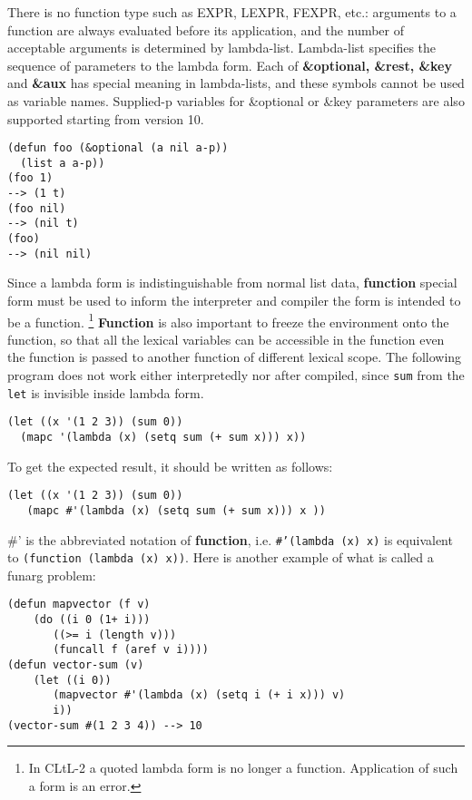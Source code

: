 There is no function type such as EXPR, LEXPR, FEXPR, etc.:
arguments to a function are always evaluated before its application,
and the number of acceptable arguments is determined by lambda-list.
Lambda-list specifies the sequence of parameters to the lambda form.
Each of {\bf \&optional, \&rest, \&key } and {\bf \&aux} has special
meaning in lambda-lists, and these symbols cannot be used as variable
names.
Supplied-p variables for \&optional or \&key parameters are also supported starting
from version 10.

\begin{verbatim}
(defun foo (&optional (a nil a-p))
  (list a a-p))
(foo 1)
--> (1 t)
(foo nil)
--> (nil t)
(foo)
--> (nil nil)
\end{verbatim}

Since a lambda form is indistinguishable from normal list data,
{\bf function} special form must be used to inform the interpreter and
compiler the form is intended to be a function.
\footnote{In CLtL-2 a quoted lambda form is no longer a function.
Application of such a form is an error.}
{\bf Function} is also important to freeze the environment onto the function,
so that all the lexical variables can be accessible in the function
even the function is passed to another function of different lexical scope.
The following program does not work either interpretedly nor after compiled,
since {\tt sum} from the {\tt let} is invisible  inside lambda form.

\begin{verbatim}
(let ((x '(1 2 3)) (sum 0))
  (mapc '(lambda (x) (setq sum (+ sum x))) x))
\end{verbatim}

To get the expected result, it should be written as follows:
\begin{verbatim}
(let ((x '(1 2 3)) (sum 0))
   (mapc #'(lambda (x) (setq sum (+ sum x))) x ))
\end{verbatim}

\#' is the abbreviated notation of {\bf function},
i.e. {\tt \#'(lambda (x) x)} is equivalent to
{\tt (function (lambda (x) x))}.
Here is another example of what is called a funarg problem:

\begin{verbatim}
(defun mapvector (f v)
    (do ((i 0 (1+ i)))
       ((>= i (length v)))
       (funcall f (aref v i))))
(defun vector-sum (v)
    (let ((i 0))
       (mapvector #'(lambda (x) (setq i (+ i x))) v)
       i))
(vector-sum #(1 2 3 4)) --> 10 
\end{verbatim}

